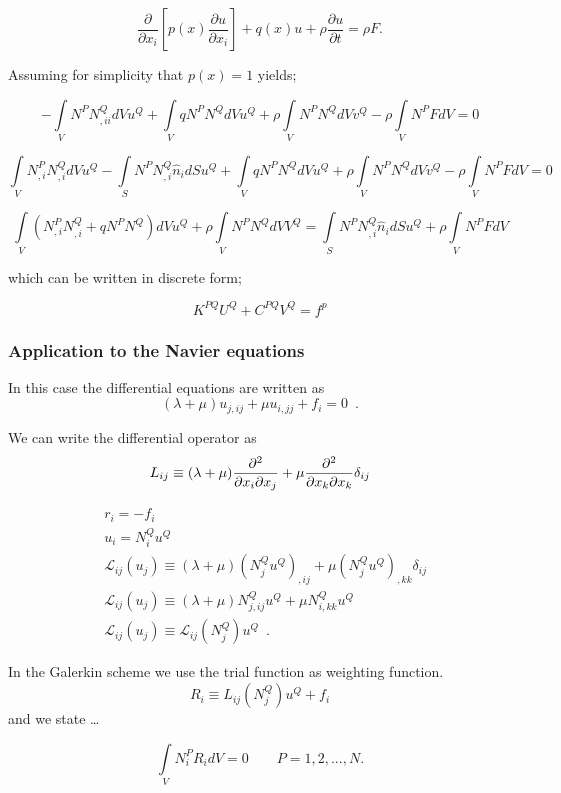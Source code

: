 \[\frac{\partial }{{\partial {x_i}}}\left[ {p(x)\frac{{\partial u}}{{\partial {x_i}}}} \right] + q(x)u + \rho \frac{{\partial u}}{{\partial t}} = \rho F.\]

Assuming for simplicity that $p(x)=1$ yields;

\[ - \int\limits_V {{N^P}N_{,ii}^Q} dV{u^Q} + \int\limits_V {q{N^P}{N^Q}dV{u^Q}}  + \rho \int\limits_V {{N^P}{N^Q}dV{v^Q}}  - \rho \int\limits_V {{N^P}FdV = 0} \]

\[\int\limits_V {N_{,i}^PN_{,i}^Q} dV{u^Q} - \int\limits_S {{N^P}N_{,i}^Q{{\hat n}_i}} dS{u^Q} + \int\limits_V {q{N^P}{N^Q}dV{u^Q}}  + \rho \int\limits_V {{N^P}{N^Q}dV{v^Q}}  - \rho \int\limits_V {{N^P}FdV = 0} \]

\[\int\limits_V {\left( {N_{,i}^PN_{,i}^Q + q{N^P}{N^Q}} \right)dV{u^Q}}  + \rho \int\limits_V {{N^P}{N^Q}dV{V^Q}}  = \int\limits_S {{N^P}N_{,i}^Q{{\hat n}_i}} dS{u^Q} + \rho \int\limits_V {{N^P}FdV} \]

which can be written in discrete form;

\[{K^{PQ}}{U^Q} + {C^{PQ}}{V^Q} = {f^p}\]



\subsubsection*{Application to the Navier equations}
In this case the differential equations are written as
\[(\lambda  + \mu ){u_{j,ij}} + \mu {u_{i,jj}} + {f_i} = 0 \enspace .\]

We can write the differential operator as
\[L_{ij} \equiv (\lambda  + \mu )\pdv[2]{}{x_i}{x_j} + \mu \pdv[2]{}{x_k}{x_k}\delta_{ij}\]

\begin{align*}
&r_i =  - f_i\\
&u_i = N_i^Q u^Q\\
&\mathcal{L}_{ij}(u_j) \equiv (\lambda  + \mu )(N_j^Q{u^Q})_{,ij} + \mu (N_j^Q{u^Q})_{,kk}\delta_{ij}\\
&\mathcal{L}_{ij}(u_j) \equiv (\lambda  + \mu )N_{j,ij}^Q u^Q + \mu N_{i,kk}^Q u^Q\\
&\mathcal{L}_{ij}(u_j) \equiv \mathcal{L}_{ij}(N_j^Q) u^Q \enspace .
\end{align*}

In the Galerkin scheme we use the trial function as weighting function.
\[R_i \equiv L_{ij}(N_j^Q) u^Q + f_i\]
and we state \dots

\[\int\limits_V {N_i^P{R_i}dV = 0} \quad \quad P=1,2,...,N. \]

